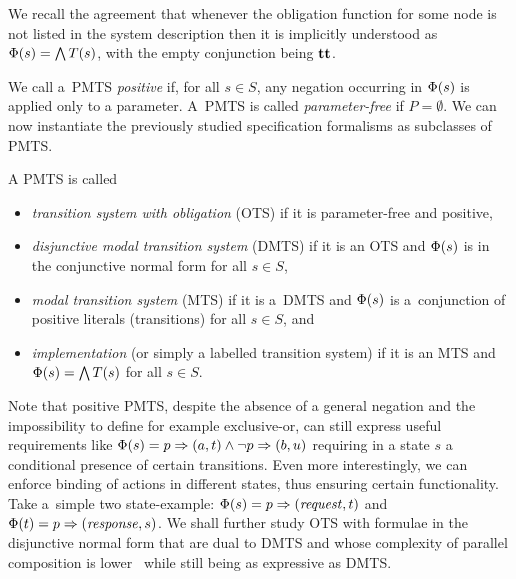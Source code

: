 We recall the agreement that whenever the obligation function for some node 
is not listed in the system description then it is implicitly understood as 
$\mathrm{\Phi}(s) = \bigwedge T(s)$, with the empty conjunction being $\mathbf{tt}$.

We call a~PMTS \emph{positive} if, for all $s \in S$, any negation 
occurring in $\mathrm{\Phi}(s)$ is applied only to a parameter. 
A~PMTS is called \emph{parameter-free} if $P = \emptyset$.
We can now instantiate the previously studied specification formalisms
as subclasses of PMTS.

\begin{definition}
A PMTS is called
\begin{itemize}
\item \emph{transition system with obligation} (OTS)
if it is parameter-free and positive,
\item
\emph{disjunctive modal transition system} (DMTS)
if it is an OTS and $\mathrm{\Phi}(s)$ is in the 
conjunctive normal form for all $s \in S$,
\item 
\emph{modal transition system} (MTS)
if it is a~DMTS and $\mathrm{\Phi}(s)$ is a~conjunction of positive literals 
(transitions) for all $s \in S$, and
\item \emph{implementation} (or simply a labelled
transition system) if it is an MTS and 
$\mathrm{\Phi}(s) = \bigwedge T(s)$ for all $s \in S$. 
\end{itemize}
\end{definition}


Note that positive PMTS, despite the absence of a general negation and the
impossibility to define for example exclusive-or, can still express 
useful requirements like 
$\mathrm{\Phi}(s)=p\Rightarrow (a,t) \wedge \neg p \Rightarrow (b,u)$
requiring in a state $s$ a conditional presence of certain transitions.
Even more interestingly, %
we can enforce binding of actions in different states, 
thus ensuring certain functionality. Take a~simple two state-example:
$\mathrm{\Phi}(s) = p \Rightarrow (\mathit{request},t)$ and
$\mathrm{\Phi}(t) = p \Rightarrow (\mathit{response},s)$.
We shall further study OTS with formulae in the disjunctive normal form
that are dual to DMTS and whose complexity of parallel composition 
is lower~\cite{benes_et_al:OASIcs:2011:3070} while still being 
as expressive as DMTS.

